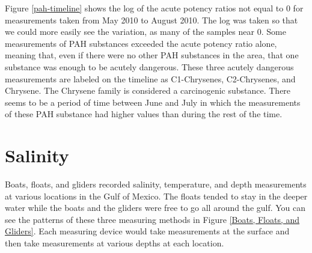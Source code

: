 \documentclass[11pt]{article}
\begin{document}
Figure \ref {pah-timeline} shows the log of the acute potency ratios not equal to 0 for measurements taken from May 2010 to August 2010. The log was taken so that we could more easily see the variation, as many of the samples near 0. Some measurements of PAH substances exceeded the acute potency ratio alone, meaning that, even if there were no other PAH substances in the area, that one substance was enough to be acutely dangerous. These three acutely dangerous measurements are labeled on the timeline as C1-Chrysenes, C2-Chrysenes, and Chrysene. The Chrysene family is considered a carcinogenic substance. There seems to be a period of time between June and July in which the measurements of these PAH substance had higher values than during the rest of the time.

\section{Salinity}
Boats, floats, and gliders recorded salinity, temperature, and depth measurements at various locations in the Gulf of Mexico. The floats tended to stay in the deeper water while the boats and the gliders were free to go all around the gulf.  You can see the patterns of these three measuring methods in Figure \ref {Boats, Floats, and Gliders}. Each measuring device would take measurements at the surface and then take measurements at various depths at each location.  
\end{document}

